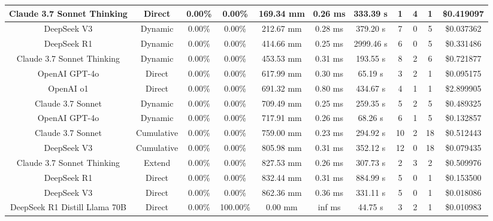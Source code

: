 \begin{landscape}
\begin{table}[H]
\begin{center}
\begin{tabular}{|c|c|c|c|c|c|c|c|c|c|c|}
    \hline
    Claude 3.7 Sonnet Thinking & Direct & 0.00\% & 0.00\% & 169.34 mm & 0.26 ms & 333.39 s & 1 & 4 & 1 & \$0.419097 \\
    \hline
    DeepSeek V3 & Dynamic & 0.00\% & 0.00\% & 212.67 mm & 0.28 ms & 379.20 s & 7 & 0 & 5 & \$0.037362 \\
    \hline
    DeepSeek R1 & Dynamic & 0.00\% & 0.00\% & 414.66 mm & 0.25 ms & 2999.46 s & 6 & 0 & 5 & \$0.331486 \\
    \hline
    Claude 3.7 Sonnet Thinking & Dynamic & 0.00\% & 0.00\% & 453.53 mm & 0.31 ms & 193.55 s & 8 & 2 & 6 & \$0.721877 \\
    \hline
    OpenAI GPT-4o & Direct & 0.00\% & 0.00\% & 617.99 mm & 0.30 ms & 65.19 s & 3 & 2 & 1 & \$0.095175 \\
    \hline
    OpenAI o1 & Direct & 0.00\% & 0.00\% & 691.32 mm & 0.80 ms & 434.67 s & 4 & 1 & 1 & \$2.899905 \\
    \hline
    Claude 3.7 Sonnet & Dynamic & 0.00\% & 0.00\% & 709.49 mm & 0.25 ms & 259.35 s & 5 & 2 & 5 & \$0.489325 \\
    \hline
    OpenAI GPT-4o & Dynamic & 0.00\% & 0.00\% & 717.91 mm & 0.26 ms & 68.26 s & 6 & 1 & 5 & \$0.132857 \\
    \hline
    Claude 3.7 Sonnet & Cumulative & 0.00\% & 0.00\% & 759.00 mm & 0.23 ms & 294.92 s & 10 & 2 & 18 & \$0.512443 \\
    \hline
    DeepSeek V3 & Cumulative & 0.00\% & 0.00\% & 805.98 mm & 0.31 ms & 352.12 s & 12 & 0 & 18 & \$0.079435 \\
    \hline
    Claude 3.7 Sonnet Thinking & Extend & 0.00\% & 0.00\% & 827.53 mm & 0.26 ms & 307.73 s & 2 & 3 & 2 & \$0.509976 \\
    \hline
    DeepSeek R1 & Direct & 0.00\% & 0.00\% & 832.44 mm & 0.31 ms & 884.99 s & 5 & 0 & 1 & \$0.153500 \\
    \hline
    DeepSeek V3 & Direct & 0.00\% & 0.00\% & 862.36 mm & 0.36 ms & 331.11 s & 5 & 0 & 1 & \$0.018086 \\
    \hline
    DeepSeek R1 Distill Llama 70B & Direct & 0.00\% & 100.00\% & 0.00 mm & inf ms & 44.75 s & 3 & 2 & 1 & \$0.010983 \\
    \hline
\end{tabular}
\label{Results-Position-1-5}
\end{center}
\end{table}


\end{landscape}
